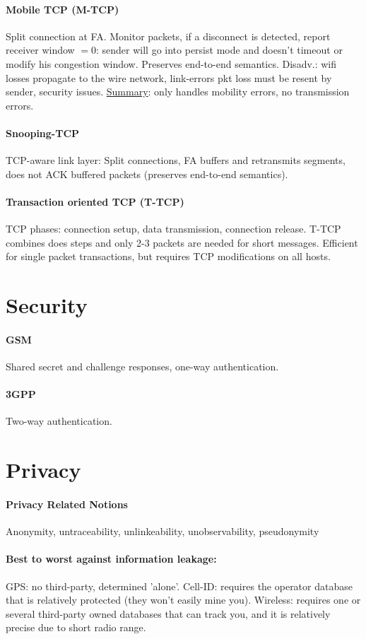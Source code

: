 \documentclass[10pt, a4paper,twocolumn]{scrartcl}
\begin{document}
\paragraph{Mobile TCP (M-TCP)} Split connection at FA. Monitor packets, if a disconnect is detected, report receiver window $= 0$: sender will go into persist mode and doesn't timeout or modify his congestion window. Preserves end-to-end semantics. Disadv.: wifi losses propagate to the wire network, link-errors pkt loss must be resent by sender, security issues. \underline{Summary}: only handles mobility errors, no transmission errors.

\paragraph{Snooping-TCP} TCP-aware link layer: Split connections, FA buffers and retransmits segments, does not ACK buffered packets (preserves end-to-end semantics).

\paragraph{Transaction oriented TCP (T-TCP)} TCP phases: connection setup, data transmission, connection release. T-TCP combines does steps and only 2-3 packets are needed for short messages. Efficient for single packet transactions, but requires TCP modifications on all hosts.

\section{Security}
\paragraph{GSM} Shared secret and challenge responses, one-way authentication.
\paragraph{3GPP} Two-way authentication.

\section{Privacy}
\paragraph{Privacy Related Notions}Anonymity, untraceability, unlinkeability, unobservability, pseudonymity
\paragraph{Best to worst against information leakage:}
GPS: no third-party, determined 'alone'.
Cell-ID: requires the operator database that is relatively protected (they won't easily mine you).
Wireless: requires one or several third-party owned databases that can track you, and it is relatively precise due to short radio range.
\end{document}
